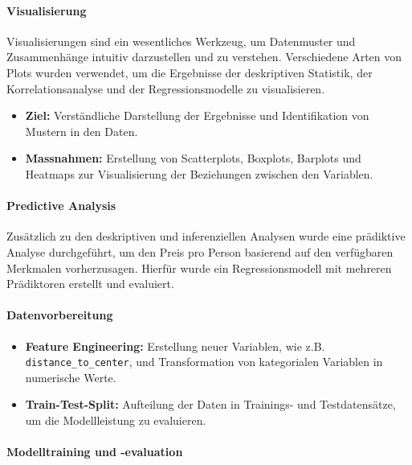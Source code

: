 \documentclass[
  journal,
]{IEEEtran}%
\let\oldparagraph\paragraph
\renewcommand{\paragraph}[1]{\oldparagraph{#1}\mbox{}}
\begin{document}
\hypertarget{visualisierung}{%
\paragraph{\texorpdfstring{\textbf{Visualisierung}}{Visualisierung}}\label{visualisierung}}

Visualisierungen sind ein wesentliches Werkzeug, um Datenmuster und
Zusammenhänge intuitiv darzustellen und zu verstehen. Verschiedene Arten
von Plots wurden verwendet, um die Ergebnisse der deskriptiven
Statistik, der Korrelationsanalyse und der Regressionsmodelle zu
visualisieren.

\begin{itemize}
\item
  \textbf{Ziel:} Verständliche Darstellung der Ergebnisse und
  Identifikation von Mustern in den Daten.
\item
  \textbf{Massnahmen:} Erstellung von Scatterplots, Boxplots, Barplots
  und Heatmaps zur Visualisierung der Beziehungen zwischen den
  Variablen.
\end{itemize}

\hypertarget{predictive-analysis}{%
\paragraph{Predictive Analysis}\label{predictive-analysis}}

Zusätzlich zu den deskriptiven und inferenziellen Analysen wurde eine
prädiktive Analyse durchgeführt, um den Preis pro Person basierend auf
den verfügbaren Merkmalen vorherzusagen. Hierfür wurde ein
Regressionsmodell mit mehreren Prädiktoren erstellt und evaluiert.

\hypertarget{datenvorbereitung}{%
\paragraph{Datenvorbereitung}\label{datenvorbereitung}}

\begin{itemize}
\item
  \textbf{Feature Engineering:} Erstellung neuer Variablen, wie z.B.
  \texttt{distance\_to\_center}, und Transformation von kategorialen
  Variablen in numerische Werte.
\item
  \textbf{Train-Test-Split:} Aufteilung der Daten in Trainings- und
  Testdatensätze, um die Modellleistung zu evaluieren.
\end{itemize}

\hypertarget{modelltraining-und--evaluation}{%
\paragraph{Modelltraining und
-evaluation}\label{modelltraining-und--evaluation}}
\end{document}
